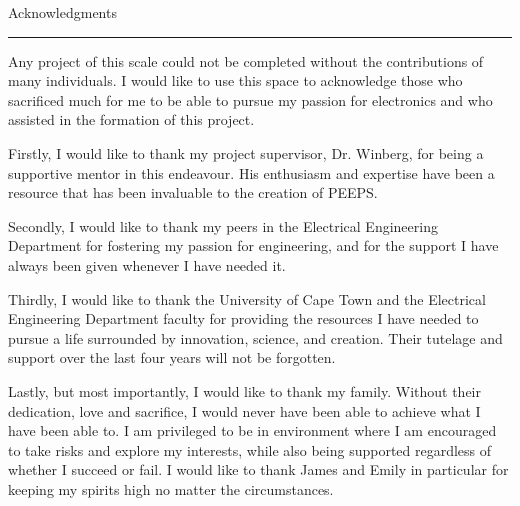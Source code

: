 \pagestyle{plain}

{\Large Acknowledgments}\\
\hrule

Any project of this scale could not be completed without the contributions of many individuals. I would like to use this space to acknowledge those who sacrificed much for me to be able to pursue my passion for electronics and who assisted in the formation of this project.

Firstly, I would like to thank my project supervisor, Dr. Winberg, for being a supportive mentor in this endeavour. His enthusiasm and expertise have been a resource that has been invaluable to the creation of PEEPS. 

Secondly, I would like to thank my peers in the Electrical Engineering Department for fostering my passion for engineering, and for the support I have always been given whenever I have needed it. 

Thirdly, I would like to thank the University of Cape Town and the Electrical Engineering Department faculty for providing the resources I have needed to pursue a life surrounded by innovation, science, and creation. Their tutelage and support over the last four years will not be forgotten.

Lastly, but most importantly, I would like to thank my family. Without their dedication, love and sacrifice, I would never have been able to achieve what I have been able to. I am privileged to be in environment where I am encouraged to take risks and explore my interests, while also being supported regardless of whether I succeed or fail. I would like to thank James and Emily in particular for keeping my spirits high no matter the circumstances.
